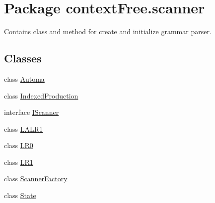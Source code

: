 \hypertarget{namespacecontext_free_1_1scanner}{\section{Package context\-Free.\-scanner}
\label{namespacecontext_free_1_1scanner}
}


Contains class and method for create and initialize grammar parser.  


\subsection*{Classes}
\begin{DoxyCompactItemize}
\item 
class \hyperlink{classcontext_free_1_1scanner_1_1_automa}{Automa}
\item 
class \hyperlink{classcontext_free_1_1scanner_1_1_indexed_production}{Indexed\-Production}
\item 
interface \hyperlink{interfacecontext_free_1_1scanner_1_1_i_scanner}{I\-Scanner}
\item 
class \hyperlink{classcontext_free_1_1scanner_1_1_l_a_l_r1}{L\-A\-L\-R1}
\item 
class \hyperlink{classcontext_free_1_1scanner_1_1_l_r0}{L\-R0}
\item 
class \hyperlink{classcontext_free_1_1scanner_1_1_l_r1}{L\-R1}
\item 
class \hyperlink{classcontext_free_1_1scanner_1_1_scanner_factory}{Scanner\-Factory}
\item 
class \hyperlink{classcontext_free_1_1scanner_1_1_state}{State}
\end{DoxyCompactItemize}


